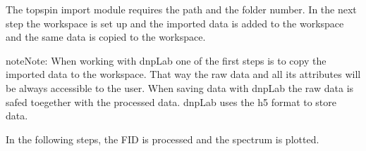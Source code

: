 \documentclass[letterpaper,10pt,english]{sphinxmanual}
\begin{document}
\begin{sphinxVerbatim}[commandchars=\\\{\}]
  
  

  
\end{sphinxVerbatim}

The topspin import module requires the path and the folder number.
In the next step the workspace is set up and the imported data is added to the  workspace and the same data is copied to the  workspace.

\begin{sphinxVerbatim}[commandchars=\\\{\}]
  
 
 
\end{sphinxVerbatim}

\begin{sphinxadmonition}{note}{Note:}
When working with dnpLab one of the first steps is to copy the imported data to the  workspace. That way the raw data and all it\textquotesingle{}s attributes will be always accessible to the user. When saving data with dnpLab the raw data is safed toegether with the processed data. dnpLab uses the h5 format to store data.
\end{sphinxadmonition}

In the following steps, the FID is processed and the spectrum is plotted.

\begin{sphinxVerbatim}[commandchars=\\\{\}]
  
  
\end{sphinxVerbatim}
\end{document}

